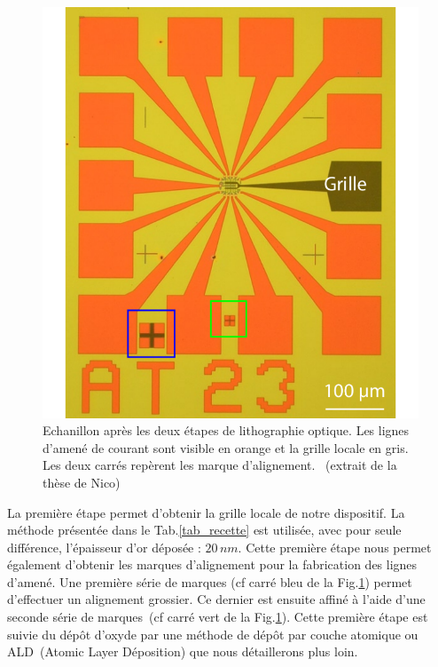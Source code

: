 \begin{figure}
\parbox{6.5cm}{
\includegraphics[scale=0.45]{Fabrication/LithoOptique/LithoOptique.pdf} 
}
\parbox{7cm}{\caption{Echanillon après les deux étapes de lithographie optique. Les lignes d'amené de courant sont visible en orange et la grille locale en gris. Les deux carrés repèrent les marque d'alignement. ~(extrait de la thèse de Nico)}
\label{LithoOptique}
}
\end{figure}

La première étape permet d'obtenir la grille locale de notre dispositif. La méthode présentée dans le Tab.\ref{tab_recette} est utilisée, avec pour seule différence, l'épaisseur d'or déposée : $20\,nm$. 
Cette première étape nous permet également d'obtenir les marques d'alignement pour la fabrication des lignes d'amené. Une première série de marques (cf carré bleu de la Fig.\ref{LithoOptique}) permet d'effectuer un alignement grossier. Ce dernier est ensuite affiné à l'aide d'une seconde série de marques~(cf carré vert de la Fig.\ref{LithoOptique}). Cette première étape est suivie du dépôt d'oxyde par une méthode de dépôt par couche atomique ou ALD~(Atomic Layer Déposition) que nous détaillerons plus loin.



